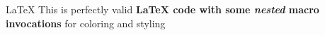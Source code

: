 \usepackage{xcolor}

\newcommand{\tcgreen}[1]{\textcolor{green}{#1}}
\renewcommand{\tcgreen}[1]{\textcolor{green}{#1}}

\newcommand{\tcred}[1]{\textcolor{red}{#1}}
\newcommand{\tcblue}[1]{\textcolor{blue}{#1}}


\begin{testenv}{\LaTeX}
This is perfectly valid \textbf{\LaTeX{} code with some \textit{nested}
macro invocations} for coloring and styling
\end{testenv}

\code

